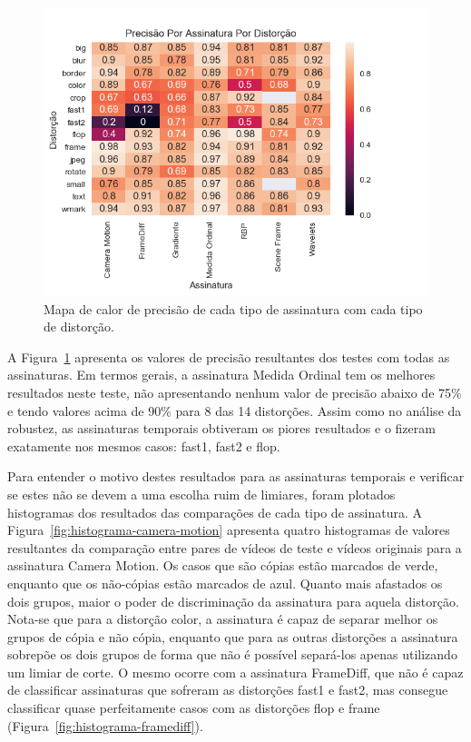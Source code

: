 \begin{figure}[h]
	\centering
	\caption{Mapa de calor de precisão de cada tipo de assinatura com cada tipo de distorção.}
	\label{fig:heatmap-precisao}
	\includegraphics[width=\textwidth]{dados/figuras/experimentos/heatmap_final_precisao.png}
\end{figure}

A Figura~\ref{fig:heatmap-precisao} apresenta os valores de precisão resultantes dos testes com todas as assinaturas. Em termos gerais, a assinatura Medida Ordinal tem os melhores resultados neste teste, não apresentando nenhum valor de precisão abaixo de 75\% e tendo valores acima de 90\% para 8 das 14 distorções. Assim como no análise da robustez, as assinaturas temporais obtiveram os piores resultados e o fizeram exatamente nos mesmos casos: fast1, fast2 e flop. 

Para entender o motivo destes resultados para as assinaturas temporais e verificar se estes não se devem a uma escolha ruim de limiares, foram plotados histogramas dos resultados das comparações de cada tipo de assinatura. A Figura~\ref{fig:histograma-camera-motion} apresenta quatro histogramas de valores resultantes da comparação entre pares de vídeos de teste e vídeos originais para a assinatura Camera Motion. Os casos que são cópias estão marcados de verde, enquanto que os não-cópias estão marcados de azul. Quanto mais afastados os dois grupos, maior o poder de discriminação da assinatura para aquela distorção. Nota-se que para a distorção color, a assinatura é capaz de separar melhor os grupos de cópia e não cópia, enquanto que para as outras distorções a assinatura sobrepõe os dois grupos de forma que não é possível separá-los apenas utilizando um limiar de corte. O mesmo ocorre com a assinatura FrameDiff, que não é capaz de classificar assinaturas que sofreram as distorções fast1 e fast2, mas consegue classificar quase perfeitamente casos com as distorções flop e frame (Figura~\ref{fig:histograma-framediff}).

